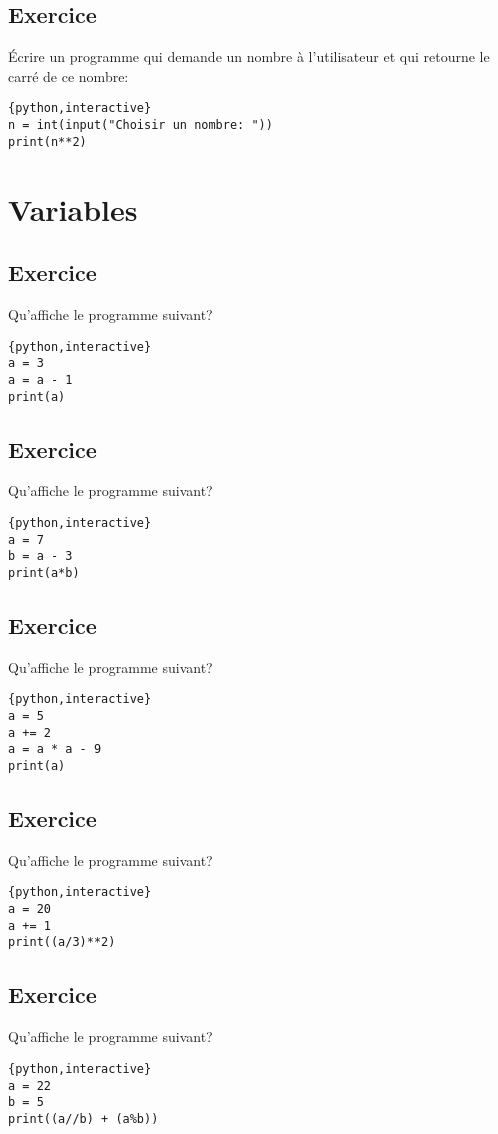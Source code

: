 \documentclass[a4paper,11pt]{article}
\begin{document}
\subsection{Exercice}
Écrire un programme qui demande un nombre à l'utilisateur et qui retourne le carré de ce nombre:\\
\begin{solution}
\begin{verbatim}{python,interactive}
n = int(input("Choisir un nombre: "))
print(n**2)
\end{verbatim}
\end{solution}

\section{Variables}

\subsection{Exercice}
Qu'affiche le programme suivant?
\begin{verbatim}{python,interactive}
a = 3
a = a - 1
print(a)
\end{verbatim}

\subsection{Exercice}
Qu'affiche le programme suivant?
\begin{verbatim}{python,interactive}
a = 7
b = a - 3
print(a*b)
\end{verbatim}

\subsection{Exercice}
Qu'affiche le programme suivant?
\begin{verbatim}{python,interactive}
a = 5
a += 2
a = a * a - 9
print(a)
\end{verbatim}

\subsection{Exercice}
Qu'affiche le programme suivant?
\begin{verbatim}{python,interactive}
a = 20
a += 1
print((a/3)**2)
\end{verbatim}

\subsection{Exercice}
Qu'affiche le programme suivant?
\begin{verbatim}{python,interactive}
a = 22
b = 5
print((a//b) + (a%b))
\end{verbatim}
\end{document}
